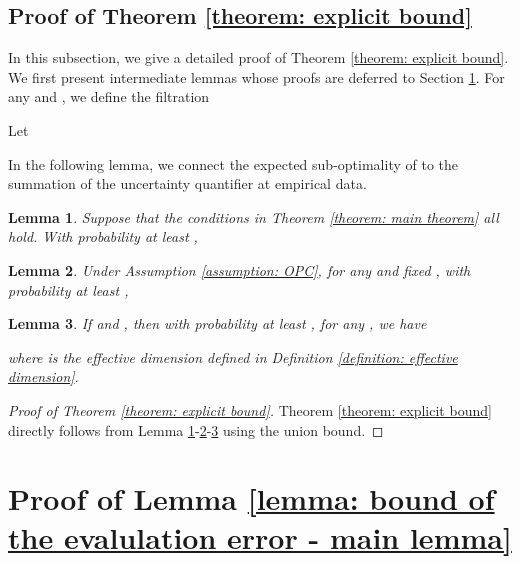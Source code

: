 \documentclass{article} \usepackage{iclr2023/iclr2023_conference,times}
\newtheorem{lemma}{Lemma}[section]
\begin{document}
\subsection{Proof of Theorem \ref{theorem: explicit bound}}
\label{susbection: proof of theorem 2}
In this subsection, we give a detailed proof of Theorem \ref{theorem: explicit bound}. We first present intermediate lemmas whose proofs are deferred to Section \ref{section: proof of main lemma about evaluation error}. For any  and , we define the filtration 

Let





In the following lemma, we connect the expected sub-optimality of  to the summation of the uncertainty quantifier at empirical data. 
\begin{lemma}
Suppose that the conditions in Theorem \ref{theorem: main theorem} all hold. With probability at least ,

\label{lemma: expected subopt to empirical confidence quantifiers}
\end{lemma}

\begin{lemma}
Under Assumption \ref{assumption: OPC}, for any  and fixed , with probability at least ,

\label{lemma:sum_sample_subopt}
\end{lemma}

\begin{lemma}
If  and , then with probability at least , for any , we have 

where  is the effective dimension defined in Definition \ref{definition: effective dimension}. 
\label{lemma: bound the summation of the uncertainty quantifier}
\end{lemma}




\begin{proof}[Proof of Theorem \ref{theorem: explicit bound}]
Theorem \ref{theorem: explicit bound} directly follows from Lemma \ref{lemma: expected subopt to empirical confidence quantifiers}-\ref{lemma:sum_sample_subopt}-\ref{lemma: bound the summation of the uncertainty quantifier} using the union bound. 
\end{proof}
 \section{Proof of Lemma \ref{lemma: bound of the evalulation error - main lemma}}
\label{section: proof of main lemma about evaluation error}
\end{document}

